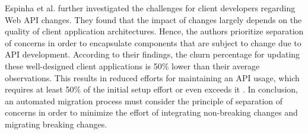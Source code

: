 Espinha et al. \cite{espinha_web_2014} further investigated the challenges for client developers regarding Web API changes. They found that the impact of changes largely depends on the quality of client application architectures. Hence, the authors prioritize separation of concerns in order to encapsulate components that are subject to change due to API development. According to their findings, the churn percentage for updating these well-designed client applications is 50\% lower than their average observations. This results in reduced efforts for maintaining an API usage, which requires at least 50\% of the initial setup effort or even exceeds it \cite{espinha_web_2014}. In conclusion, an automated migration process must consider the principle of separation of concerns in order to minimize the effort of integrating non-breaking changes and migrating breaking changes.